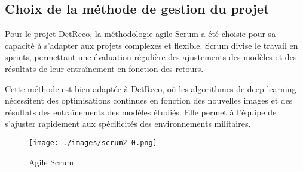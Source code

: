 
\subsection{Choix de la méthode de gestion du projet}

Pour le projet DetReco, la méthodologie agile Scrum a été choisie pour sa capacité à s'adapter aux projets complexes et flexible.
Scrum divise le travail en sprints, permettant une évaluation régulière des ajustements des modèles et des résultats de leur entraînement en fonction des retours.

Cette méthode est bien adaptée à DetReco, où les algorithmes de deep learning nécessitent des optimisations continues en fonction des nouvelles images et des résultats des entraînements des modèles étudiés.
Elle permet à l'équipe de s'ajuster rapidement aux spécificités des environnements militaires.


\begin{figure}[H]
    \texttt{[image: ./images/scrum2-0.png]}
    \caption[Agile Scrum]{Agile Scrum \cite{exaraw2024}}
    \label{fig:map-train}
\end{figure}

